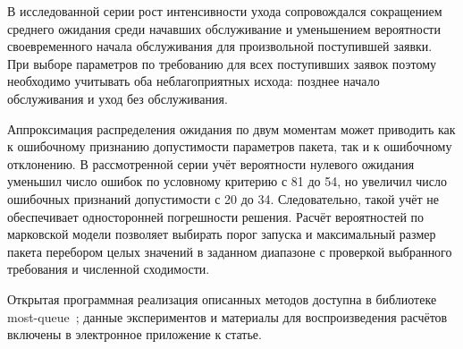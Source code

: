 В исследованной серии рост интенсивности ухода сопровождался сокращением среднего ожидания среди начавших обслуживание и уменьшением вероятности своевременного начала обслуживания для произвольной поступившей заявки. При выборе параметров по требованию для всех поступивших заявок поэтому необходимо учитывать оба неблагоприятных исхода: позднее начало обслуживания и уход без обслуживания.

Аппроксимация распределения ожидания по двум моментам может приводить как к ошибочному признанию допустимости параметров пакета, так и к ошибочному отклонению. В рассмотренной серии учёт вероятности нулевого ожидания уменьшил число ошибок по условному критерию с 81 до 54, но увеличил число ошибочных признаний допустимости с 20 до 34. Следовательно, такой учёт не обеспечивает односторонней погрешности решения. Расчёт вероятностей по марковской модели позволяет выбирать порог запуска и максимальный размер пакета перебором целых значений в заданном диапазоне с проверкой выбранного требования и численной сходимости.

Открытая программная реализация описанных методов доступна в библиотеке most-queue~\cite{mostqueue2026}; данные экспериментов и материалы для воспроизведения расчётов включены в электронное приложение к статье.
